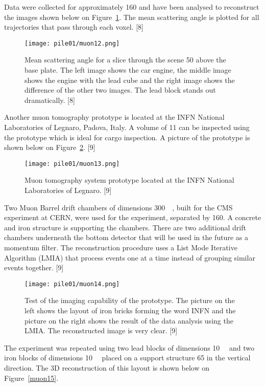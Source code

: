 \documentclass[a4paper]{article}
\begin{document}
Data were collected for approximately \unit{160}{\minute} and have been analysed to reconstruct the images
shown below on Figure~\ref{muon12}. The mean scattering angle is plotted for all trajectories that pass through
each voxel. [8]

\begin{figure}[h!]
  \texttt{[image: pile01/muon12.png]}
  \caption{Mean scattering angle for a slice through the scene \unit{50}{\centi\metre} above the base plate. The left
image shows the car engine, the middle image shows the engine with the lead cube and the right
image shows the difference of the other two images. The lead block stands out dramatically. [8]}
  \label{muon12}
\end{figure}

Another muon tomography prototype is located at the INFN National Laboratories of Legnaro,
Padova, Italy. A volume of \unit{11}{\cubic\metre} can be inspected using the prototype which is ideal for cargo
inspection. A picture of the prototype is shown below on Figure~\ref{muon13}. [9]

\begin{figure}[h!]
  \texttt{[image: pile01/muon13.png]}
  \caption{Muon tomography system prototype located at the INFN National Laboratories of
Legnaro. [9]}
  \label{muon13}
\end{figure}

Two Muon Barrel drift chambers of dimensions \unit{300}{\cubic{\centi\metre}}, built for the CMS experiment at
CERN, were used for the experiment, separated by \unit{160}{\centi\metre}. A concrete and iron structure is
supporting the chambers. There are two additional drift chambers underneath the bottom detector
that will be used in the future as a momentum filter. The reconstruction procedure uses a List Mode
Iterative Algorithm (LMIA) that process events one at a time instead of grouping similar events
together. [9]

\begin{figure}[h!]
  \texttt{[image: pile01/muon14.png]}
  \caption{Test of the imaging capability of the prototype. The picture on the left shows the layout of
iron bricks forming the word INFN and the picture on the right shows the result of the data analysis
using the LMIA. The reconstructed image is very clear. [9]}
  \label{muon14}
\end{figure}

The experiment was repeated using two lead blocks of dimensions \unit{10}{\cubic{\centi\metre}} and two iron
blocks of dimensions \unit{10}{\cubic{\centi\metre}} placed on a support structure \unit{65}{\centi\metre} in the vertical direction. The
3D reconstruction of this layout is shown below on Figure~\ref{muon15}.
\end{document}
